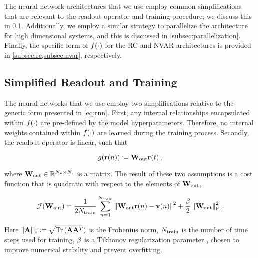 The neural network architectures that we use employ common
simplifications that are relevant to the readout operator and training
procedure; we discuss this in \cref{subsec:readout}.
Additionally, we employ a similar strategy to parallelize the architecture for
high dimensional systems, and this is discussed in
\cref{subsec:parallelization}.
Finally, the specific form of $f(\cdot)$ for the RC and NVAR architectures
is provided in \cref{subsec:rc,subsec:nvar},
respectively.


\subsection{Simplified Readout and Training}
\label{subsec:readout}

The neural networks that we use employ two
simplifications relative to the generic form presented in
\cref{eq:rnn}.
First, any internal relationships encapsulated within
$f(\cdot)$ are pre-defined by the model hyperparameters.
Therefore, no internal weights contained within $f(\cdot)$
are learned during the training process.
Secondly, the readout operator is linear, such that
\begin{linenomath*}\begin{equation*}
    g(\mathbf{r}(n)) \coloneqq \mathbf{W}_\text{out} \mathbf{r}(t) \, ,
\end{equation*}\end{linenomath*}
where $\mathbf{W}_\text{out} \in \mathbb{R}^{N_{\mathbf{v}}\times N_{\mathbf{r}}}$ is a matrix.
The result of these two assumptions is a cost function that is quadratic with
respect to the elements of $\mathbf{W}_\text{out}$,
\begin{linenomath*}\begin{equation}
    \mathcal{J}(\mathbf{W}_\text{out}) =
        \dfrac{1}{2N_\text{train}}\sum_{n=1}^{N_\text{train}}
        \left\lVert\mathbf{W}_\text{out} \mathbf{r}(n) - \mathbf{v}(n)\right\rVert^2
        +
        \dfrac{\beta}{2}\left\lVert\mathbf{W}_\text{out}\right\rVert_\text{F}^2 \, .
    \label{eq:cost}
\end{equation}\end{linenomath*}
Here
$\left\lVert\mathbf{A}\right\rVert_\text{F} \coloneqq
\sqrt{\text{Tr}\left(\mathbf{A}\mathbf{A}^T\right)}$
is the Frobenius norm,
$N_\text{train}$ is the number of time steps used for training,
$\beta$ is a Tikhonov regularization parameter \citep{tikhonov_solution_1963}, chosen to improve
numerical stability and prevent overfitting.

